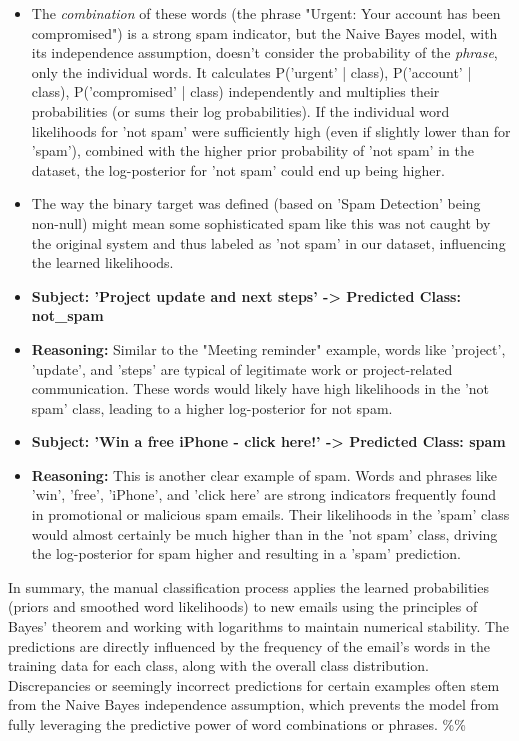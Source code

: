 \documentclass[12pt,a4paper]{article}
\begin{document}
\begin{itemize}
    \item The \textit{combination} of these words (the phrase "Urgent: Your account has been compromised") is a strong spam indicator, but the Naive Bayes model, with its independence assumption, doesn't consider the probability of the \textit{phrase}, only the individual words. It calculates P('urgent' | class), P('account' | class), P('compromised' | class) independently and multiplies their probabilities (or sums their log probabilities). If the individual word likelihoods for 'not spam' were sufficiently high (even if slightly lower than for 'spam'), combined with the higher prior probability of 'not spam' in the dataset, the log-posterior for 'not spam' could end up being higher.
    \item The way the binary target was defined (based on 'Spam Detection' being non-null) might mean some sophisticated spam like this was not caught by the original system and thus labeled as 'not spam' in our dataset, influencing the learned likelihoods.
    \item \textbf{Subject: 'Project update and next steps' -> Predicted Class: not\_spam}
    \item \textbf{Reasoning:} Similar to the "Meeting reminder" example, words like 'project', 'update', and 'steps' are typical of legitimate work or project-related communication. These words would likely have high likelihoods in the 'not spam' class, leading to a higher log-posterior for not spam.
    \item \textbf{Subject: 'Win a free iPhone - click here!' -> Predicted Class: spam}
    \item \textbf{Reasoning:} This is another clear example of spam. Words and phrases like 'win', 'free', 'iPhone', and 'click here' are strong indicators frequently found in promotional or malicious spam emails. Their likelihoods in the 'spam' class would almost certainly be much higher than in the 'not spam' class, driving the log-posterior for spam higher and resulting in a 'spam' prediction.
\end{itemize}

In summary, the manual classification process applies the learned probabilities (priors and smoothed word likelihoods) to new emails using the principles of Bayes' theorem and working with logarithms to maintain numerical stability. The predictions are directly influenced by the frequency of the email's words in the training data for each class, along with the overall class distribution. Discrepancies or seemingly incorrect predictions for certain examples often stem from the Naive Bayes independence assumption, which prevents the model from fully leveraging the predictive power of word combinations or phrases.
\%\%
\end{document}
